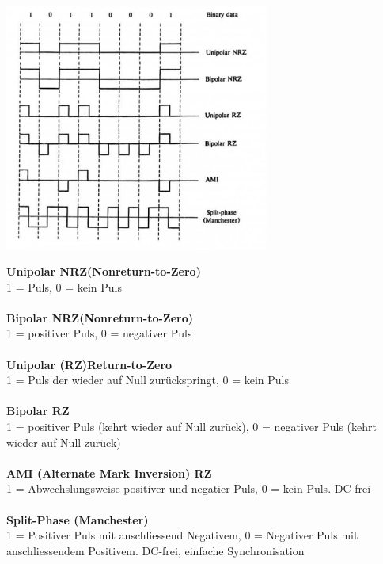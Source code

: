 \begin{minipage}{9cm}
	\includegraphics[width=8.7cm]{bilder/dig_leitungscodierung.png}
\end{minipage}
\begin{minipage}{9cm}
	\textbf{Unipolar NRZ(Nonreturn-to-Zero)} \\
	1 = Puls, 0 = kein Puls \\ \\
	\textbf{Bipolar NRZ(Nonreturn-to-Zero)} \\
	1 = positiver Puls, 0 = negativer Puls \\ \\
	\textbf{Unipolar (RZ)Return-to-Zero} \\
	1 = Puls der wieder auf Null zurückspringt, 0 = kein Puls \\ \\
	\textbf{Bipolar RZ} \\
	1 = positiver Puls (kehrt wieder auf Null zurück), 0 = negativer Puls (kehrt wieder auf Null
	zurück)\\ \\
	\textbf{AMI (Alternate Mark Inversion) RZ} \\
	1 = Abwechslungsweise positiver und negatier Puls, 0 = kein Puls. DC-frei\\ \\
	\textbf{Split-Phase (Manchester)} \\
	1 = Positiver Puls mit anschliessend Negativem, 0 = Negativer Puls mit anschliessendem Positivem. DC-frei, einfache Synchronisation
\end{minipage}


